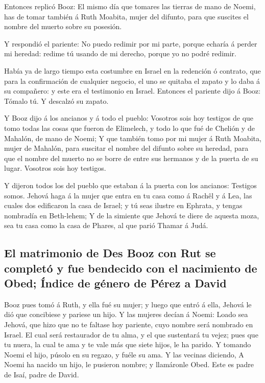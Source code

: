  Entonces replicó Booz: El mismo día que tomares las tierras
de mano de Noemi, has de tomar también á Ruth Moabita, mujer del
difunto, para que suscites el nombre del muerto sobre su posesión.

 Y respondió el pariente: No puedo redimir por mi parte,
porque echaría á perder mi heredad: redime tú usando de mi derecho,
porque yo no podré redimir.

 Había ya de largo tiempo esta costumbre en Israel en la
redención ó contrato, que para la confirmación de cualquier negocio, el
uno se quitaba el zapato y lo daba á su compañero: y este era el
testimonio en Israel.  Entonces el pariente dijo á Booz:
Tómalo tú. Y descalzó su zapato.

 Y Booz dijo á los ancianos y á todo el pueblo: Vosotros
sois hoy testigos de que tomo todas las cosas que fueron de Elimelech, y
todo lo que fué de Chelión y de Mahalón, de mano de Noemi; 
Y que también tomo por mi mujer á Ruth Moabita, mujer de Mahalón, para
suscitar el nombre del difunto sobre su heredad, para que el nombre del
muerto no se borre de entre sus hermanos y de la puerta de su lugar.
Vosotros sois hoy testigos.

 Y dijeron todos los del pueblo que estaban á la puerta con
los ancianos: Testigos somos. Jehová haga á la mujer que entra en tu
casa como á Rachêl y á Lea, las cuales dos edificaron la casa de Israel;
y tú seas ilustre en Ephrata, y tengas nombradía en Beth-lehem;
 Y de la simiente que Jehová te diere de aquesta moza, sea
tu casa como la casa de Phares, al que parió Thamar á Judá.

\hypertarget{el-matrimonio-de-des-booz-con-rut-se-completuxf3-y-fue-bendecido-con-el-nacimiento-de-obed-uxedndice-de-guxe9nero-de-puxe9rez-a-david}{%
\subsection{El matrimonio de Des Booz con Rut se completó y fue
bendecido con el nacimiento de Obed; Índice de género de Pérez a
David}\label{el-matrimonio-de-des-booz-con-rut-se-completuxf3-y-fue-bendecido-con-el-nacimiento-de-obed-uxedndice-de-guxe9nero-de-puxe9rez-a-david}}

 Booz pues tomó á Ruth, y ella fué su mujer; y luego que
entró á ella, Jehová le dió que concibiese y pariese un hijo.
 Y las mujeres decían á Noemi: Loado sea Jehová, que hizo
que no te faltase hoy pariente, cuyo nombre será nombrado en Israel.
 El cual será restaurador de tu alma, y el que sustentará
tu vejez; pues que tu nuera, la cual te ama y te vale más que siete
hijos, le ha parido.  Y tomando Noemi el hijo, púsolo en su
regazo, y fuéle su ama.  Y las vecinas diciendo, A Noemi ha
nacido un hijo, le pusieron nombre; y llamáronle Obed. Este es padre de
Isaí, padre de David.

